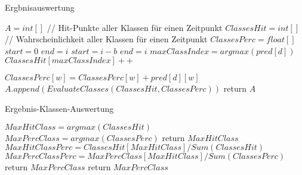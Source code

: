     \begin{algorithm}\label{alg:Ergbnisauswertung}
        \caption{Ergbnisauswertung}
        \begin{algorithmic}[1]
            \State {}
            \State
            \State ${A} = int[ ]$
                \State
                \State // Hit-Punkte aller Klassen für einen Zeitpunkt
                \State $ClassesHit = int[ ]$
                \State // Wahrscheinlichkeit aller Klassen für einen Zeitpunkt
                \State $ClassesPerc = float[ ]$
                \State
                    \State $start = 0$
                    \State $end = i$
                \Else
                    \State $start = i - b$
                    \State $end = i$
                \EndIf
                \State
                    \State $maxClassIndex = argmax(pred[d])$
                    \State $ClassesHit[maxClassIndex]++$

                        \State $ClassesPerc[w] = ClassesPerc[w] + pred[d][w]$
                    \EndFor
                \EndFor
                \State
                \State $A.append(EvaluateClasses(ClassesHit, ClassesPerc))$
                \State
            \EndFor
            \State return $A$
        \EndFunction
        \end{algorithmic}
    \end{algorithm}
    \begin{algorithm}
        \caption{Ergebnis-Klassen-Auswertung}
        \begin{algorithmic}[1]
            \State {}
            \State
            \State $MaxHitClass = argmax(ClassesHit)$
            \State $MaxPercClass = argmax(ClassesPerc)$
            \State
                \State return $MaxHitClass$
            \Else
                \State
                \State $MaxHitClassPerc = ClassesHit[MaxHitClass] / Sum(ClassesHit) $
                \State $MaxPercClassPerc = MaxPercClass[MaxHitClass] / Sum(ClassesPerc) $
                \State
                    \State return $MaxPercClass$
                \Else
                    \State return $MaxPercClass$
                \EndIf
            \EndIf
        \EndFunction
        \end{algorithmic}
    \end{algorithm}